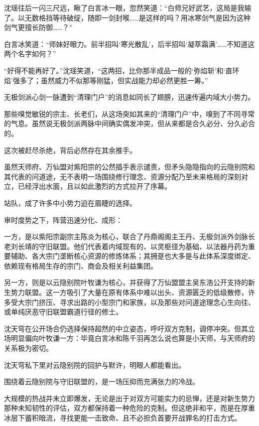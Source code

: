 沈瑶往后一闪三尺远，瞅了白言冰一眼，忽然笑道：“白师兄好武艺，这局是我输了。以无数格挡等待破绽，随即一剑封喉……是这样的吗？用冰寒剑气是因为这种剑气更擅长防御……？”

白言冰笑道：“师妹好眼力。前半招叫‘寒光散乱’，后半招叫‘凝萃霜满’……不知道这两个名字如何？”

“好得不能再好了。”沈瑶笑道，“这两招，比你那半成品一般的‘弥焰斩’和‘直环焰’强多了；虽然威力不似那等刚猛，但实战能力却必然更胜一筹。”

\vspace{2em}

无极剑派心剑一脉遭到“清理门户”的消息如同长了翅膀，迅速传遍内域大小势力。

那些嗅觉敏锐的宗主、长老们，从这场突如其来的“清理门户”中，嗅到了不同寻常的气息。虽然说无极剑派两脉中间确实偶发冲突，但从来都是合久必分、分久必合的。

这次被赶尽杀绝，背后必然存在其余推手。

虽然天师府、万仙盟对紫阳宗的公然插手表示谴责，但矛头隐隐指向的云隐别院和其代表的问道途，无不表明一场围绕修行理念、资源分配乃至未来格局的深刻对立，已经浮出水面，且以如此激烈的方式拉开了序幕。

站队，成了许多中小势力迫在眉睫的选择。

审时度势之下，阵营迅速分化、成形：

一方，是以紫阳宗副宗主陈炎为核心，联合了丹鼎阁阁主王丹、无极剑派外剑脉长老刘长靖的守旧联盟。他们代表着内域现有的、以灵枢径为基础、以法器丹药为重要辅助、各大宗门垄断核心资源的修炼体系；其拥趸也大多是与此体系深度绑定、依赖现有格局生存的宗门、商会及相关利益集团。

另一方，则是以云隐别院叶牧谦为核心，并获得了万仙盟盟主吴东浩公开支持的新生势力联盟。这一方吸引了大量在原有体系中难以出头、资源匮乏的低级散修，许多受大宗门挤压、寻求出路的小型宗门和家族，以及那些对问道途理念心生向往、或单纯厌恶守旧联盟霸道行径的修士。

沈天穹在公开场合仍选择保持超然的中立姿态，呼吁双方克制，调停冲突。但其立场明显偏向叶牧谦一方：毕竟白言冰和陈千羽再怎么说也算是小天师，与天师府的关系极为密切。

沈天穹私下里对云隐别院的回护与默许，明眼人都能看出。

\vspace{2em}

围绕着云隐别院与守旧联盟的，是一场压抑而充满张力的冷战。

大规模的热战并未立即爆发，无论是出于对双方可能实力的忌惮，还是对新生势力那种未知韧性的评估，双方都保持着一种危险的克制。但这绝非和平，而是在厚重冰层下蓄积暗流，寻找更能一击致命、且不必担负首要开战罪名的打击方式。

